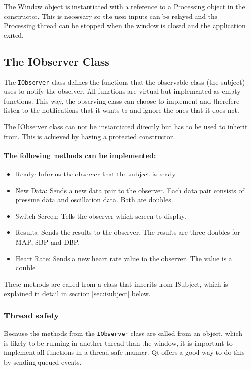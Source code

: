 The Window object is instantiated with a reference to a Processing object in the constructor. This is necessary so the user inputs can be relayed and the Processing thread can be stopped when the window is closed and the application exited. 

\subsection{The IObserver Class}
The \texttt{IObserver} class defines the functions that the observable class (the subject) uses to notify the observer. All functions are virtual but implemented as empty functions. This way, the observing class can choose to implement and therefore listen to the notifications that it wants to and ignore the ones that it does not. 

The IObserver class can not be instantiated directly but has to be used to inherit from. This is achieved by having a protected constructor.

\paragraph{The following methods can be implemented:}
\begin{itemize}[noitemsep]
\item Ready: \newline
Informs the observer that the subject is ready.
\item New Data: \newline
Sends a new data pair to the observer. Each data pair consists of pressure data and oscillation data. Both are doubles.
\item Switch Screen: \newline
Tells the observer which screen to display.
\item Results: \newline
Sends the results to the observer. The results are three doubles for MAP, SBP and DBP.
\item Heart Rate: \newline
Sends a new heart rate value to the observer. The value is a double.
\end{itemize}

These methods are called from a class that inherits from ISubject, which is explained in detail in section \ref{sec:isubject} below. 

\subsubsection{Thread safety}
Because the methods from the \texttt{IObserver} class are called from an object, which is likely to be running in another thread than the window, it is important to implement all functions in a thread-safe manner. Qt offers a good way to do this by sending queued events. 

